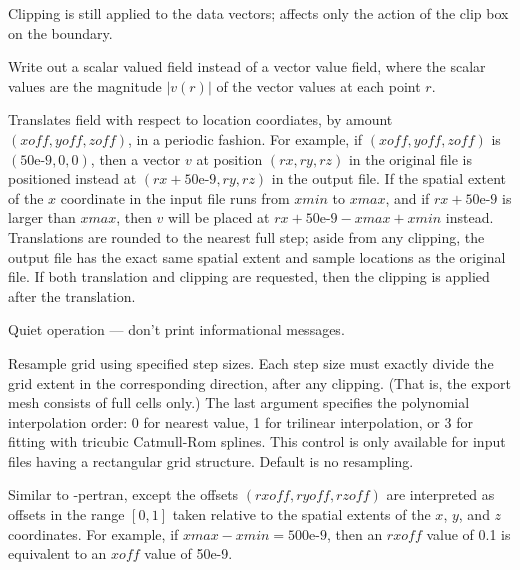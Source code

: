 \begin{description}
  Clipping is still applied to the data vectors;  affects
  only the action of the clip box on the boundary.
\item[\optkey{-mag}]
  Write out a scalar valued field instead of a vector value field, where
  the scalar values are the magnitude $|v(r)|$ of the vector values at
  each point $r$.
\item[\optkey{-pertran xoff yoff zoff}]
  Translates field with respect to location coordiates, by amount
  $(\mathit{xoff},\mathit{yoff},\mathit{zoff})$, in a periodic
  fashion.  For example, if
  $(\mathit{xoff},\mathit{yoff},\mathit{zoff})$ is $(\mbox{50e-9},0,0)$,
  then a vector $v$ at position
  $(\mathit{rx},\mathit{ry},\mathit{rz})$
  in the original file is positioned instead at
  $(\mathit{rx} + \mbox{50e-9},\mathit{ry},\mathit{rz})$
  in the output file.  If the spatial extent of the
  $x$ coordinate in the input file runs from $\mathit{xmin}$ to
  $\mathit{xmax}$, and if
  $\mathit{rx} +\mbox{50e-9}$ is larger than $\mathit{xmax}$, then $v$
  will be placed at
  $\mathit{rx} + \mbox{50e-9} - \mathit{xmax} + \mathit{xmin}$
  instead.  Translations are rounded to the
  nearest full step; aside from any clipping, the output file has the
  exact same spatial extent and sample locations as the original file.
  If both translation and clipping are requested, then the clipping is
  applied after the translation.
\item[\optkey{-q}]
  Quiet operation --- don't print informational messages.
\item[\optkey{-resample xstep ystep zstep \boa 0\pipe 1\pipe 3\bca}]
  Resample grid using specified step sizes.  Each step size must exactly
  divide the grid extent in the corresponding direction, after any
  clipping.  (That is, the export mesh consists of full cells only.)
  The last argument specifies the polynomial interpolation order: 0 for
  nearest value, 1 for trilinear interpolation, or 3 for fitting with
  tricubic Catmull-Rom splines.  This control is only available for
  input files having a rectangular grid structure.  Default is no
  resampling.
\item[\optkey{-rpertran rxoff ryoff rzoff}]
  Similar to -pertran, except the offsets
  $(\mathit{rxoff},\mathit{ryoff},\mathit{rzoff})$ are
  interpreted as offsets in the range $[0,1]$ taken relative to the
  spatial extents of the $x$, $y$, and $z$ coordinates.  For example, if
  $\mathit{xmax} - \mathit{xmin} = \mbox{500e-9}$, then an
  $\mathit{rxoff}$ value of 0.1 is equivalent
  to an $\mathit{xoff}$ value of 50e-9.

\end{description}
